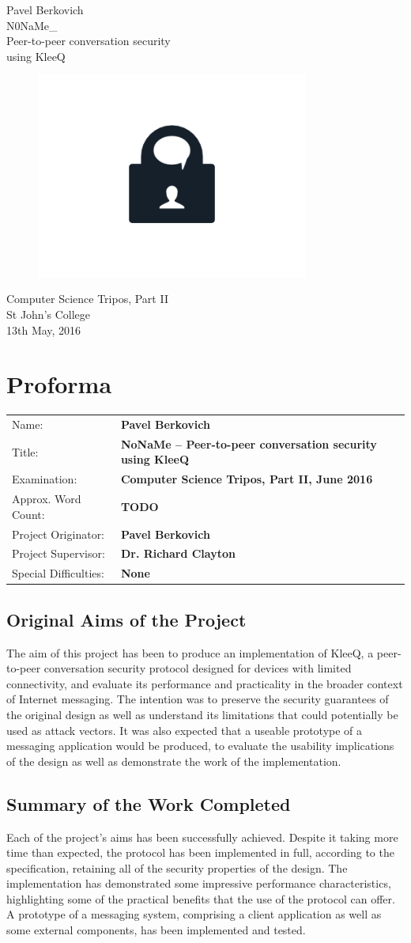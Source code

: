 \documentclass[a4paper, 12pt]{report}
\newcommand{\funkytt}{\fontfamily{AnonymousPro}\selectfont}
\newcommand*{\titleTH}{ %
\begingroup
\raggedleft
\thispagestyle{empty}
{\Large Pavel Berkovich}\\[0.167\textheight] \centering
{\huge{\funkytt N0NaMe\_}}\\[\baselineskip]
{\Large Peer-to-peer conversation security \\ using KleeQ} \\
\begin{figure}[h]
    \centering
    \includegraphics[width = 0.8\textwidth]{lock_chat.png} 
\end{figure}
{\large Computer Science Tripos, Part II}\\ \vspace{3mm}
{\large St John's College} \\ \vspace{3mm}
{\large 13th May, 2016}
\vfill
\clearpage
\endgroup}
\begin{document}
\titleTH


\chapter*{Proforma}
\begin{tabular}{l >{\bfseries}l}
    Name: & Pavel Berkovich \\
    Title: & NoNaMe -- Peer-to-peer conversation security using KleeQ \\
    Examination: & Computer Science Tripos, Part II, June 2016 \\
    Approx. Word Count: & {\color{red} TODO} \\
    Project Originator: & Pavel Berkovich \\
    Project Supervisor: & Dr. Richard Clayton \\
    Special Difficulties: & None
\end{tabular}

\section*{Original Aims of the Project}
The aim of this project has been to produce an implementation of KleeQ, a peer-to-peer conversation security protocol designed for devices with limited connectivity, and evaluate its performance and practicality in the broader context of Internet messaging. The intention was to preserve the security guarantees of the original design as well as understand its limitations that could potentially be used as attack vectors. It was also expected that a useable prototype of a messaging application would be produced, to evaluate the usability implications of the design as well as demonstrate the work of the implementation.

\section*{Summary of the Work Completed}

Each of the project's aims has been successfully achieved. Despite it taking more time than expected, the protocol has been implemented in full, according to the specification, retaining all of the security properties of the design. The implementation has demonstrated some impressive performance characteristics, highlighting some of the practical benefits that the use of the protocol can offer. A prototype of a messaging system, comprising a client application as well as some external components, has been implemented and tested. \\
\end{document}
